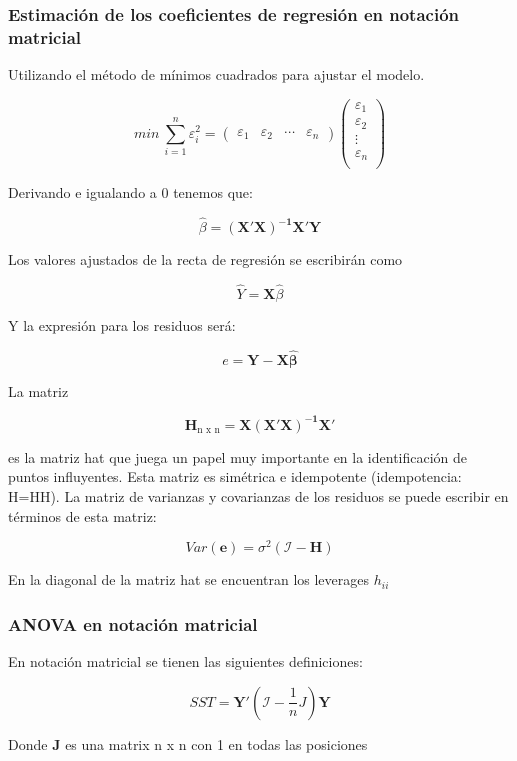 \subsubsection{Estimación de los coeficientes de regresión en notación matricial}

Utilizando el método de mínimos cuadrados para ajustar el modelo. 

$$
min\ \sum_{i=1}^{n}\varepsilon_i^2=\begin{pmatrix}
    \varepsilon_1 & \varepsilon_2 & \cdots & \varepsilon_n
\end{pmatrix}\begin{pmatrix}
    \varepsilon_1 \\
    \varepsilon_2 \\
    \vdots \\
    \varepsilon_n \\
\end{pmatrix}
$$

Derivando e igualando a 0 tenemos que:

$$
\hat\beta=\mathbf{(X'X)^{-1}X'Y}
$$

Los valores ajustados de la recta de regresión se escribirán como

$$
\hat Y=\mathbf{X}\hat\beta
$$

Y la expresión para los residuos será:

$$
e=\mathbf{Y-X\hat\beta}
$$

La matriz

$$
\mathbf{H}_{\text{n x n}}=\mathbf{X(X'X)^{-1}X'}
$$

es la matriz hat que juega un papel muy importante en la identificación de puntos influyentes. Esta matriz es simétrica e idempotente (idempotencia: H=HH). La matriz de varianzas y covarianzas de los residuos se puede escribir en términos de esta matriz:

$$
Var(\mathbf{e})=\sigma^2(\mathcal{I}-\mathbf{H})
$$

En la diagonal de la matriz hat se encuentran los leverages $h_{ii}$

\subsubsection{ANOVA en notación matricial}

En notación matricial se tienen las siguientes definiciones:

$$
SST= \mathbf{Y'}\left(\mathcal{I}-\frac{1}{n}J\right)\mathbf{Y}
$$

Donde \textbf{J} es una matrix n x n con 1 en todas las posiciones

